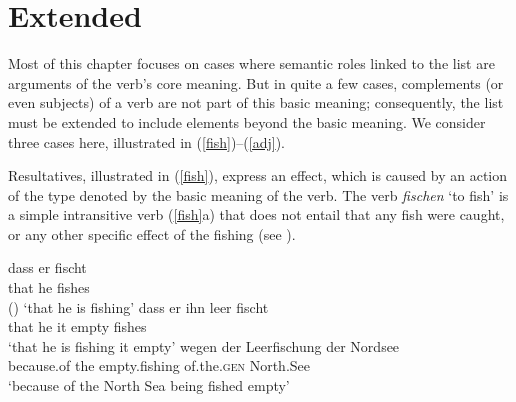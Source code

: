 \documentclass[output=paper,biblatex,babelshorthands,newtxmath,draftmode,colorlinks, citecolor=brown]{langscibook}
\begin{document}




\section{Extended \texorpdfstring{\argst}{ARG-ST}}
\label{sec:extended-arg-st}

%
Most of this chapter focuses on cases where semantic roles linked to the \argst list are arguments
of the verb's core meaning. But in quite a few cases, complements (or even subjects) of a verb are
not part of this basic meaning; consequently, the \argst list must be extended to include elements
beyond the basic meaning. We consider three cases here, illustrated in (\ref{fish})--(\ref{adj}).

Resultatives, illustrated in (\ref{fish}), express an effect, which is caused by an
action of the type denoted by the basic meaning of the verb. The verb \textit{fischen} `to fish' is
a simple intransitive verb (\ref{fish}a) that does not entail that any fish were caught, or any
other specific effect of the fishing (see \citealt[219--220]{Mueller2002b}).  

\begin{exe}
\ex\label{fish}
\begin{xlist}
\ex
\gll dass er  fischt\\
     that he  fishes\\\hfill()
\glt `that he is fishing'
\ex 
\gll dass er ihn leer fischt\\
     that he it empty fishes\\
\glt `that he is fishing it empty'
\ex 
\gll wegen der Leerfischung der Nordsee\footnotemark\\
     because.of the empty.fishing of.the.\textsc{gen} North.See \\
\glt `because of the North Sea being fished empty'
\end{xlist}
\end{exe}
\end{document}
